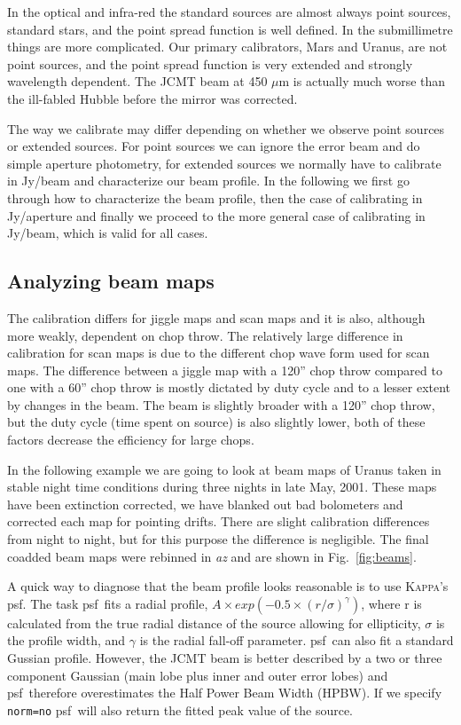 \documentclass[twoside,11pt]{article}
\newcommand{\Kappa}{\xref{\textsc{Kappa}}{sun95}{}}
\newcommand{\task}[1]{\textsf{#1}}
\newcommand{\psf}{\xref{\task{psf}}{sun95}{PSF}}
\newcommand{\xref}[3]{#1}
\newcommand{\xlabel}[1]{}
\renewcommand{\_}{\texttt{\symbol{95}}}
\begin{document}
In the optical and infra-red the standard sources are almost always
point sources, standard stars, and the point spread function is well
defined.  In the submillimetre things are more complicated.  Our
primary calibrators, Mars and Uranus, are not point sources, and the
point spread function is very extended and strongly wavelength
dependent.  The JCMT beam at 450 $\mu$m is actually much worse than
the ill-fabled Hubble before the mirror was corrected.

The way we calibrate may differ depending on whether we observe point
sources or extended sources.  For point sources we can ignore the
error beam and do simple aperture photometry, for extended sources we
normally have to calibrate in Jy/beam and characterize our beam
profile.  In the following we first go through how to characterize the
beam profile, then the case of calibrating in Jy/aperture and finally
we proceed to the more general case of calibrating in Jy/beam, which
is valid for all cases.


\subsection{\xlabel{beam_profiles} Analyzing beam maps
\label{beam_profiles}}

The calibration differs for jiggle maps and scan maps and it is also,
although more weakly, dependent on chop throw.  The relatively large
difference in calibration for scan maps is due to the different chop
wave form used for scan maps.  The difference between a jiggle map
with a 120'' chop throw compared to one with a 60'' chop throw is
mostly dictated by duty cycle and to a lesser extent by changes in the
beam.  The beam is slightly broader with a 120'' chop throw, but the
duty cycle (time spent on source) is also slightly lower, both of
these factors decrease the efficiency for large chops.


In the following example we are going to look at beam maps of Uranus
taken in stable night time conditions during three nights in late May,
2001. These maps have been extinction corrected, we have blanked out
bad bolometers and corrected each map for pointing drifts. There are
slight calibration differences from night to night, but for this
purpose the difference is negligible. The final coadded beam maps were
rebinned in {\it az} and are shown in Fig.\ \ref{fig:beams}.

A quick way to diagnose that the beam profile looks reasonable is to
use \Kappa's \psf.  The task \psf\ fits a radial profile, $ A \times
exp(-0.5 \times (r/\sigma)^\gamma)$, where r is calculated from the
true radial distance of the source allowing for ellipticity, $\sigma$
is the profile width, and $\gamma$ is the radial fall-off parameter.
\psf\ can also fit a standard Gussian profile.  However, the JCMT beam
is better described by a two or three component Gaussian (main lobe
plus inner and outer error lobes) and \psf\ therefore overestimates the
Half Power Beam Width (HPBW). If we specify \texttt{norm=no} \psf\ will
also return the fitted peak value of the source.
\end{document}
